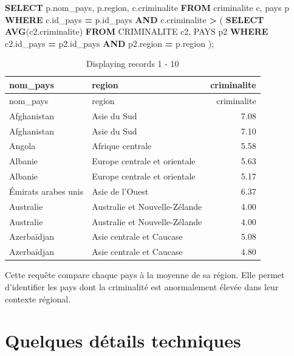 \documentclass[mstat,12pt]{unswthesis}
\newenvironment{Shaded}{\begin{snugshade}}{\end{snugshade}}
\newcommand{\FunctionTok}[1]{\textcolor[rgb]{0.13,0.29,0.53}{\textbf{#1}}}
\newcommand{\KeywordTok}[1]{\textcolor[rgb]{0.13,0.29,0.53}{\textbf{#1}}}
\newcommand{\NormalTok}[1]{#1}
\newcommand{\OperatorTok}[1]{\textcolor[rgb]{0.81,0.36,0.00}{\textbf{#1}}}
\begin{document}
\begin{Shaded}
\begin{Highlighting}[]
\KeywordTok{SELECT}\NormalTok{ p.nom\_pays, p.region, c.criminalite }
\KeywordTok{FROM}\NormalTok{ criminalite c, pays p }
\KeywordTok{WHERE}\NormalTok{ c.id\_pays }\OperatorTok{=}\NormalTok{ p.id\_pays }
\KeywordTok{AND}\NormalTok{ c.criminalite }\OperatorTok{\textgreater{}}\NormalTok{ ( }\KeywordTok{SELECT} \FunctionTok{AVG}\NormalTok{(c2.criminalite) }
\KeywordTok{FROM}\NormalTok{ CRIMINALITE c2, PAYS p2 }\KeywordTok{WHERE}\NormalTok{ c2.id\_pays }\OperatorTok{=}\NormalTok{ p2.id\_pays }
\KeywordTok{AND}\NormalTok{ p2.region }\OperatorTok{=}\NormalTok{ p.region );}
\end{Highlighting}
\end{Shaded}

\begin{longtable}[]{@{}llr@{}}
\caption{Displaying records 1 - 10}\tabularnewline
\toprule\noalign{}
nom\_pays & region & criminalite \\
\midrule\noalign{}
\endfirsthead
\toprule\noalign{}
nom\_pays & region & criminalite \\
\midrule\noalign{}
\endhead
\bottomrule\noalign{}
\endlastfoot
Afghanistan & Asie du Sud & 7.08 \\
Afghanistan & Asie du Sud & 7.10 \\
Angola & Afrique centrale & 5.58 \\
Albanie & Europe centrale et orientale & 5.63 \\
Albanie & Europe centrale et orientale & 5.17 \\
Émirats arabes unis & Asie de l'Ouest & 6.37 \\
Australie & Australie et Nouvelle-Zélande & 4.00 \\
Australie & Australie et Nouvelle-Zélande & 4.00 \\
Azerbaïdjan & Asie centrale et Caucase & 5.08 \\
Azerbaïdjan & Asie centrale et Caucase & 4.80 \\
\end{longtable}

Cette requête compare chaque pays à la moyenne de sa région. Elle permet
d'identifier les pays dont la criminalité est anormalement élevée dans
leur contexte régional.

\section{Quelques détails
techniques}\label{quelques-duxe9tails-techniques}
\end{document}
